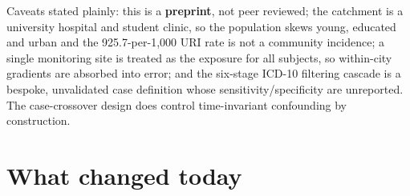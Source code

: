 \documentclass[10pt]{article}
\begin{document}
\vspace{2mm}
{\fontsize{7.6}{9.2}\selectfont\color{Slate}Caveats stated plainly: this is a
\textbf{preprint}, not peer reviewed; the catchment is a university hospital and student
clinic, so the population skews young, educated and urban and the 925.7-per-1{,}000 URI
rate is not a community incidence; a single monitoring site is treated as the exposure for
all subjects, so within-city gradients are absorbed into error; and the six-stage ICD-10
filtering cascade is a bespoke, unvalidated case definition whose sensitivity/specificity
are unreported. The case-crossover design does control time-invariant confounding by
construction.\par}

\vspace{4mm}

\section*{\sffamily\bfseries\color{Deep}What changed today}
\vspace{-1.5mm}{\color{Amber}\rule{\linewidth}{1.1pt}}\vspace{2.5mm}
\end{document}
